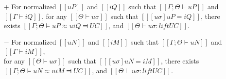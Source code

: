\begin{lemma} \label{lemma:unification-completeness}
    \hfill
    \begin{itemize}
        \item [$+$] For normalized $[[uP]]$ and $[[iQ]]$ such that
        $[[Γ ; Θ ⊢ uP]]$ and $[[Γ ⊢ iQ]]$, 
        for any $[[Θ ⊢ uσ]]$ such that $[[ [uσ]uP = iQ ]]$,
        there exists $[[Γ ; Θ ⊨ uP ≈u iQ ⫤ UC]]$,
        and $[[Θ ⊢ uσ : lift UC]]$.
        
        \item [$-$] For normalized $[[uN]]$ and $[[iM]]$ such that
        $[[Γ ; Θ ⊢ uN]]$ and $[[Γ ⊢ iM]]$,\\
        for any $[[Θ ⊢ uσ]]$ such that $[[ [uσ]uN = iM ]]$,
        there exists $[[Γ ; Θ ⊨ uN ≈u iM ⫤ UC]]$,
        and $[[Θ ⊢ uσ : lift UC]]$.
   \end{itemize}
\end{lemma}
